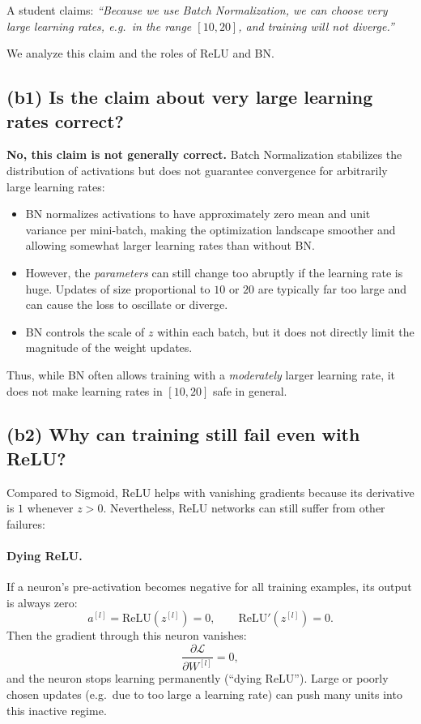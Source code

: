 \documentclass{article}
\begin{document}
A student claims:
\emph{``Because we use Batch Normalization, we can choose very large
	learning rates, e.g.\ in the range $[10,20]$, and training will not
	diverge.''}

We analyze this claim and the roles of ReLU and BN.

\subsection*{(b1) Is the claim about very large learning rates correct?}

\textbf{No, this claim is not generally correct.}
Batch Normalization stabilizes the distribution of activations but does
not guarantee convergence for arbitrarily large learning rates:

\begin{itemize}
	\item BN normalizes activations to have approximately zero mean and
	unit variance per mini-batch, making the optimization landscape
	smoother and allowing somewhat larger learning rates than without BN.
	\item However, the \emph{parameters} can still change too abruptly if
	the learning rate is huge. Updates of size proportional to $10$
	or $20$ are typically far too large and can cause the loss to
	oscillate or diverge.
	\item BN controls the scale of $z$ within each batch, but it does not
	directly limit the magnitude of the weight updates.
\end{itemize}

Thus, while BN often allows training with a \emph{moderately} larger
learning rate, it does not make learning rates in $[10,20]$ safe in general.

\subsection*{(b2) Why can training still fail even with ReLU?}

Compared to Sigmoid, ReLU helps with vanishing gradients because
its derivative is $1$ whenever $z>0$.
Nevertheless, ReLU networks can still suffer from other failures:

\paragraph{Dying ReLU.}
If a neuron's pre-activation becomes negative for all training examples,
its output is always zero:
\[
a^{[l]} = \mathrm{ReLU}(z^{[l]}) = 0, \qquad
\mathrm{ReLU}'(z^{[l]}) = 0.
\]
Then the gradient through this neuron vanishes:
\[
\frac{\partial\mathcal{L}}{\partial W^{[l]}} = 0,
\]
and the neuron stops learning permanently (``dying ReLU'').
Large or poorly chosen updates (e.g.\ due to too large a learning rate)
can push many units into this inactive regime.
\end{document}
